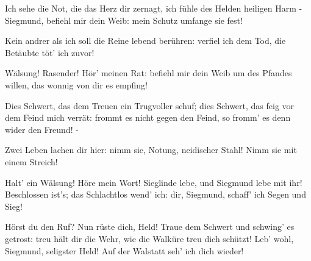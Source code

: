 \begin{drama}
\Brunnhildespeaks
Ich sehe die Not, die das Herz dir zernagt,
ich fühle des Helden heiligen Harm -
Siegmund, befiehl mir dein Weib:
mein Schutz umfange sie fest!
 

\Siegmundspeaks
Kein andrer als ich soll die Reine lebend berühren:
verfiel ich dem Tod, die Betäubte töt' ich zuvor!
 

\Brunnhildespeaks


Wälsung! Rasender! Hör' meinen Rat:
befiehl mir dein Weib um des Pfandes willen,
das wonnig von dir es empfing!
 

\Siegmundspeaks


Dies Schwert, das dem Treuen ein Trugvoller schuf;
dies Schwert, das feig vor dem Feind mich verrät:
frommt es nicht gegen den Feind,
so fromm' es denn wider den Freund! -
 



Zwei Leben lachen dir hier:
nimm sie, Notung, neidischer Stahl!
Nimm sie mit einem Streich!
 

\Brunnhildespeaks


Halt' ein Wälsung! Höre mein Wort!
Sieglinde lebe, und Siegmund lebe mit ihr!
Beschlossen ist's; das Schlachtlos wend' ich:
dir, Siegmund, schaff' ich Segen und Sieg!
 



Hörst du den Ruf? Nun rüste dich, Held!
Traue dem Schwert und schwing' es getrost:
treu hält dir die Wehr,
wie die Walküre treu dich schützt!
Leb' wohl, Siegmund, seligster Held!
Auf der Walstatt seh' ich dich wieder!
 




\Siegmundspeaks



\end{drama}
